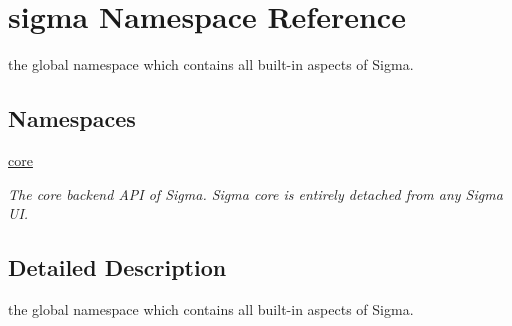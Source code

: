 \hypertarget{namespacesigma}{\section{sigma Namespace Reference}
\label{namespacesigma}
}


the global namespace which contains all built-\/in aspects of Sigma.  


\subsection*{Namespaces}
\begin{DoxyCompactItemize}
\item 
\hyperlink{namespacesigma_1_1core}{core}
\begin{DoxyCompactList}\small\item\em The core backend A\-P\-I of Sigma. Sigma core is entirely detached from any Sigma U\-I. \end{DoxyCompactList}\end{DoxyCompactItemize}


\subsection{Detailed Description}
the global namespace which contains all built-\/in aspects of Sigma. 